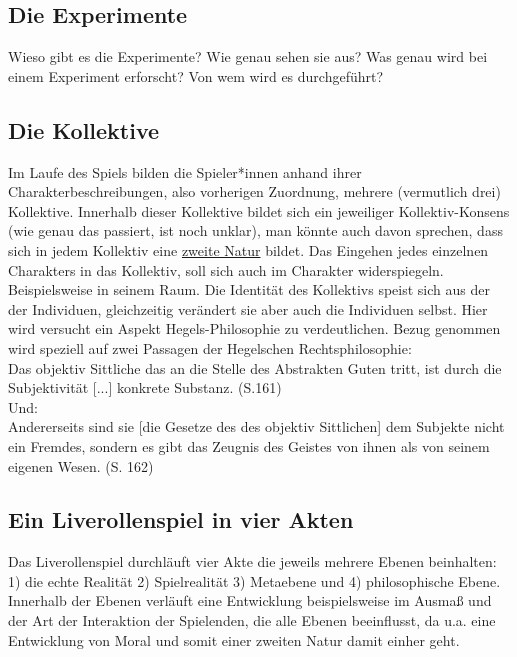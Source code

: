 \documentclass[a4paper, 12pt]{scrartcl}
\begin{document}
    \subsection{Die Experimente}
    Wieso gibt es die Experimente? 
    Wie genau sehen sie aus? 
    Was genau wird bei einem Experiment erforscht? 
    Von wem wird es durchgeführt? \\
    \subsection{Die Kollektive}
    Im Laufe des Spiels bilden die Spieler*innen anhand ihrer Charakterbeschreibungen, also vorherigen Zuordnung, mehrere (vermutlich drei) Kollektive. 
    Innerhalb dieser Kollektive bildet sich ein jeweiliger Kollektiv-Konsens (wie genau das passiert, ist noch unklar), man könnte auch davon sprechen, dass sich in jedem Kollektiv eine \hyperref[zweite-natur]{\glqq zweite Natur\grqq{}} bildet. 
    Das Eingehen jedes einzelnen Charakters in das Kollektiv, soll sich auch im Charakter widerspiegeln. Beispielsweise in seinem Raum. Die Identität des Kollektivs speist sich aus der der Individuen, gleichzeitig verändert sie aber auch die Individuen selbst. 
    Hier wird versucht ein Aspekt Hegels-Philosophie zu verdeutlichen. Bezug genommen wird speziell auf zwei Passagen der Hegelschen Rechtsphilosophie: \\
    \glqq Das objektiv Sittliche das an die Stelle des Abstrakten Guten tritt, ist durch die Subjektivität [...] konkrete Substanz.\grqq{} (S.161)\cite{BuchHegel} \\
    Und:\\
    \glqq Andererseits sind sie [die Gesetze des des objektiv Sittlichen] dem Subjekte nicht ein Fremdes, sondern es gibt das Zeugnis des Geistes von ihnen als von seinem eigenen Wesen.\grqq{} (S. 162)\cite{BuchHegel} 
    
    \subsection{Ein Liverollenspiel in vier Akten}
    Das Liverollenspiel durchläuft vier Akte die jeweils mehrere Ebenen beinhalten: 1) die echte Realität 2) Spielrealität 3) Metaebene und 4) philosophische Ebene. Innerhalb der Ebenen verläuft eine Entwicklung beispielsweise im Ausmaß und der Art der Interaktion der Spielenden, die alle Ebenen beeinflusst, da u.a. eine Entwicklung von Moral und somit einer zweiten Natur damit einher geht.
\end{document}
